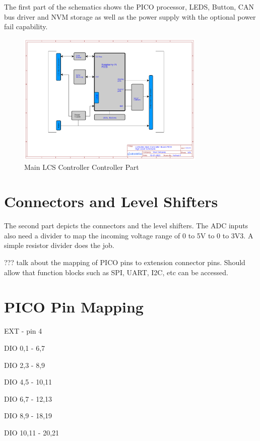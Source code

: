 The first part of the schematics shows the PICO processor, LEDS, Button, CAN bus driver and NVM storage as well as the power supply with the optional power fail capability.

\begin{figure}[htbp]
    \centering
    \includegraphics[page=2, width=0.8\textwidth]{./Schematics/Schematic_LcsNodes-Main-Controller-Board.pdf}
    \caption{Main LCS Controller Controller Part}
\end{figure}
\FloatBarrier

\section{Connectors and Level Shifters}

The second part depicts the connectors and the level shifters. The ADC inputs also need a divider to map the incoming voltage range of 0 to 5V to 0 to 3V3. A simple resistor divider does the job.


??? talk about the mapping of PICO pins to extension connector pins. Should allow that function blocks such as SPI, UART, I2C, etc can be accessed.

\section{PICO Pin Mapping}

EXT             - pin 4

DIO 0,1         - 6,7

DIO 2,3         - 8,9

DIO 4,5         - 10,11

DIO 6,7         - 12,13

DIO 8,9         - 18,19

DIO 10,11       - 20,21


